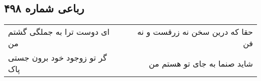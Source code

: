 \begin{center}
\section*{رباعی شماره ۴۹۸}
\label{sec:sh498}
\begin{longtable}{l p{0.5cm} r}
ای دوست ترا به جملگی گشتم من
&&
حقا که درین سخن نه زرقست و نه فن
\\
گر تو زوجود خود برون جستی پاک
&&
شاید صنما به جای تو هستم من
\\
\end{longtable}
\end{center}
